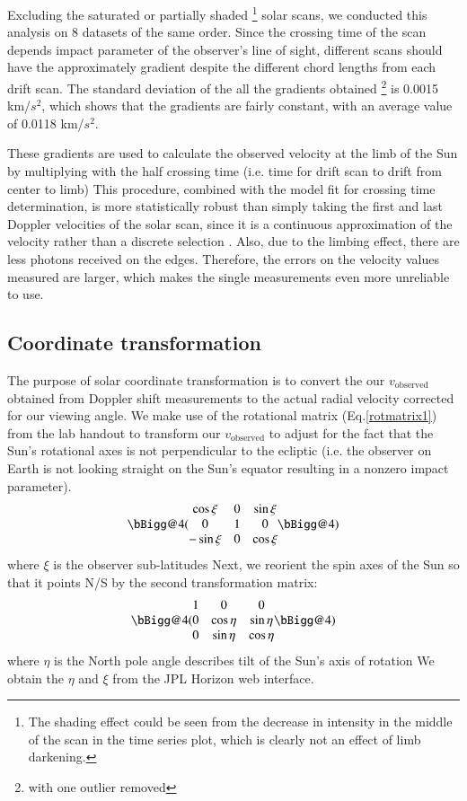 \documentclass[authoryear, 12pt,5p, times]{elsarticle}
\begin{document}
Excluding the saturated or partially shaded \footnote{The shading effect could be seen from the decrease in intensity in the middle of the scan in the time series plot, which is clearly not an effect of limb darkening.} solar scans, we conducted this analysis on 8 datasets of the same order. Since the crossing time of the scan depends impact parameter of the observer's line of sight, different scans should have the approximately gradient despite the different chord lengths from  each drift scan. The standard deviation of the all the gradients obtained \footnote{with one outlier removed} is 0.0015 km/$s^2$, which shows that the gradients are fairly constant, with an average value of 0.0118 km/$s^2$. 

These gradients are used to calculate the observed velocity at the limb of the Sun by multiplying with the half crossing time (i.e. time for drift scan to drift from center to limb)
This procedure, combined with the model fit for crossing time determination, is more statistically robust than simply taking the first and last Doppler velocities of the solar scan, since it is a continuous approximation of the velocity rather than a discrete selection . Also, due to the limbing effect, there are less photons received on the edges. Therefore, the errors on the velocity values measured are larger, which makes the single measurements even more unreliable to use.
\subsection{Coordinate transformation}
The purpose of solar coordinate transformation is to convert the our $v_{\text{observed}}$ obtained from Doppler shift measurements to the actual radial velocity corrected for our viewing angle.
We make use of the rotational matrix (Eq.\ref{rotmatrix1}) from the lab handout to transform our $v_{\text{observed}}$ to adjust for the fact that the Sun's rotational axes is not perpendicular to the ecliptic (i.e. the observer on Earth is not looking straight on the Sun's equator resulting in a nonzero impact parameter).
\begin{equation}
\bBigg@{4}(\begin{matrix}
\cos\xi & 0 &\sin\xi \\ 
0 &1  &0 \\ 
-\sin\xi &0  &\cos\xi 
\end{matrix}\bBigg@{4})
\label{rotmatrix1}
\end{equation}
where  $\xi$ is the  observer sub-latitudes
Next, we reorient the spin axes of the Sun so that it points N/S by the second transformation matrix: 
\begin{equation}
\bBigg@{4}(\begin{matrix}
1& 0 &0 \\ 
0 &\cos\eta  &\sin\eta \\ 
0 &\sin \eta  &\cos\eta 
\end{matrix}\bBigg@{4})
\label{rotmatrix2}
\end{equation}
where $\eta$ is the North pole angle describes tilt of the Sun's axis of rotation
We obtain the  $\eta$  and $\xi$ from the JPL Horizon web interface.
\end{document}
